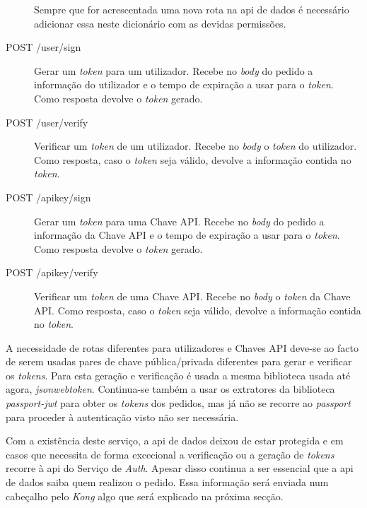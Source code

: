 \begin{description}
        Sempre que for acrescentada uma nova rota na \acrshort{api} de dados é necessário adicionar essa neste dicionário com as devidas permissões.
    \item[POST /user/sign] Gerar um \textit{token} para um utilizador. Recebe no \textit{body} do pedido a informação do utilizador e o tempo de expiração a usar para o \textit{token}. Como resposta devolve o \textit{token} gerado.
    \item[POST /user/verify] Verificar um \textit{token} de um utilizador. Recebe no \textit{body} o \textit{token} do utilizador. Como resposta, caso o \textit{token} seja válido, devolve a informação contida no \textit{token}.
    \item[POST /apikey/sign] Gerar um \textit{token} para uma Chave API. Recebe no \textit{body} do pedido a informação da Chave API e o tempo de expiração a usar para o \textit{token}. Como resposta devolve o \textit{token} gerado.
    \item[POST /apikey/verify] Verificar um \textit{token} de uma Chave API. Recebe no \textit{body} o \textit{token} da Chave API. Como resposta, caso o \textit{token} seja válido, devolve a informação contida no \textit{token}.
\end{description}

A necessidade de rotas diferentes para utilizadores e Chaves API deve-se ao facto de serem usadas pares de chave pública/privada diferentes para gerar e verificar os \textit{tokens}. Para esta geração e verificação é usada a mesma biblioteca usada até agora, \textit{jsonwebtoken}. Continua-se também a usar os extratores da biblioteca \textit{passport-jwt} para obter os \textit{tokens} dos pedidos, mas já não se recorre ao \textit{passport} para proceder à autenticação visto não ser necessária.

Com a existência deste serviço, a \acrshort{api} de dados deixou de estar protegida e em casos que necessita de forma excecional a verificação ou a geração de \textit{tokens} recorre à \acrshort{api} do Serviço de \textit{Auth}. Apesar disso continua a ser essencial que a \acrshort{api} de dados saiba quem realizou o pedido. Essa informação será enviada num cabeçalho pelo \textit{Kong} algo que será explicado na próxima secção.

